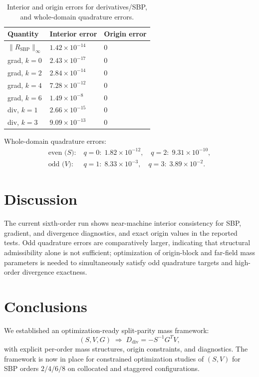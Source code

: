 \documentclass[
  aps,
  pre,
  reprint,
  superscriptaddress,
  nofootinbib
]{revtex4-2}
\newcommand{\Rsbp}{R_{\mathrm{SBP}}}
\newcommand{\Ddiv}{D_{\mathrm{div}}}
\begin{document}
\begin{table}[t]
  \caption{Interior and origin errors for derivatives/SBP, and whole-domain quadrature errors.}
  \label{tab:diag6}
  \begin{ruledtabular}
  \begin{tabular}{lll}
    Quantity & Interior error & Origin error \\
    \hline
    $\|\Rsbp\|_\infty$ & $1.42\times 10^{-14}$ & $0$ \\
    grad, $k=0$ & $2.43\times 10^{-17}$ & $0$ \\
    grad, $k=2$ & $2.84\times 10^{-14}$ & $0$ \\
    grad, $k=4$ & $7.28\times 10^{-12}$ & $0$ \\
    grad, $k=6$ & $1.49\times 10^{-8}$ & $0$ \\
    div, $k=1$ & $2.66\times 10^{-15}$ & $0$ \\
    div, $k=3$ & $9.09\times 10^{-13}$ & $0$ \\
  \end{tabular}
  \end{ruledtabular}
\end{table}

Whole-domain quadrature errors:
\begin{align}
  \text{even ($S$):}\;& q=0:\;1.82\times 10^{-12}, \quad q=2:\;9.31\times 10^{-10},\\
  \text{odd ($V$):}\;& q=1:\;8.33\times 10^{-3}, \quad q=3:\;3.89\times 10^{-2}.
\end{align}

\section{Discussion}
The current sixth-order run shows near-machine interior consistency for SBP,
gradient, and divergence diagnostics, and exact origin values in the reported tests.
Odd quadrature errors are comparatively larger, indicating that structural admissibility
alone is not sufficient; optimization of origin-block and far-field mass parameters is
needed to simultaneously satisfy odd quadrature targets and high-order divergence
exactness.

\section{Conclusions}
We established an optimization-ready split-parity mass framework:
\begin{equation}
  (S,V,G)\;\Longrightarrow\;\Ddiv=-S^{-1}G^TV,
\end{equation}
with explicit per-order mass structures, origin constraints, and diagnostics.
The framework is now in place for constrained optimization studies of $(S,V)$
for SBP orders $2/4/6/8$ on collocated and staggered configurations.
\end{document}
